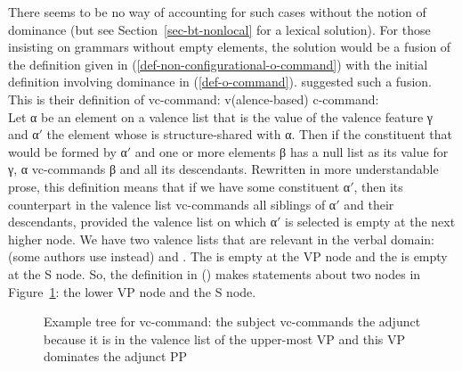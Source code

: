 \documentclass[output=paper,biblatex,babelshorthands,newtxmath,draftmode,colorlinks,citecolor=brown]{langscibook}
\begin{document}


There seems to be no way of accounting for such cases without the notion of
dominance (but see Section~\ref{sec-bt-nonlocal} for a lexical solution). For those insisting on
grammars without empty elements, the solution would be a fusion of the definition given in
(\ref{def-non-configurational-o-command}) with the initial definition involving dominance in
(\ref{def-o-command}). \citet{HL95b} suggested such a fusion. This is their definition of vc-command:
\eanoraggedright
\label{def-vc-command-HL}
v(alence-based) c-command:\\
Let α be an element on a valence list that is the value of the valence feature γ and α$'$ the \dtrs element whose \synsemv is structure-shared
with α. Then if the constituent that would be formed by α$'$ and one or more elements β has a null
list as its value for γ, α vc-commands β and all its descendants.
\z
\largerpage
Rewritten in more understandable prose, this definition means that if we have some constituent α$'$,
then its counterpart in the valence list vc-commands all siblings of α$'$ and their
descendants, provided the valence list on which α$'$ is selected is empty at the next higher node. We have two
valence lists that are relevant in the verbal domain: \subj (some authors use \spr instead) and
\comps. The \compsl is empty at the VP node and the \subjl is empty at the S node. So, the
definition in () makes statements about two nodes in Figure~\ref{fig-vc-command-HL}: the
lower VP node and the S node. 
\begin{figure}[b]
\caption{Example tree for vc-command: the subject vc-commands the adjunct because it is
  in the valence list of the upper-most VP and this VP dominates the adjunct PP}\label{fig-vc-command-HL}
\end{figure}
\end{document}
